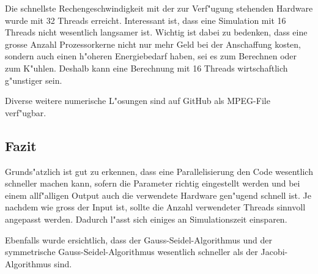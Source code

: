 \begin{refsection}
Die schnellste Rechengeschwindigkeit mit der zur Verf"ugung
stehenden Hardware wurde mit 32 Threads erreicht. Interessant ist, dass
eine Simulation mit 16 Threads nicht wesentlich langsamer ist. Wichtig
ist dabei zu bedenken, dass eine grosse Anzahl Prozessorkerne nicht
nur mehr Geld bei der Anschaffung kosten, sondern auch einen h"oheren
Energiebedarf haben, sei es zum Berechnen oder zum K"uhlen. Deshalb kann
eine Berechnung mit 16 Threads wirtschaftlich g"unstiger sein. 

Diverse weitere numerische L"osungen sind auf GitHub als
MPEG-File verf"ugbar.
	
\subsection{Fazit}
Grunds"atzlich ist gut zu erkennen, dass eine Parallelisierung den Code
wesentlich schneller machen kann, sofern die Parameter richtig eingestellt
werden und bei einem allf"alligen Output auch die verwendete Hardware
gen"ugend schnell ist. Je nachdem wie gross der Input ist, sollte die
Anzahl verwendeter Threads sinnvoll angepasst werden. Dadurch l"asst
sich einiges an Simulationszeit einsparen. 
	
Ebenfalls wurde ersichtlich, dass der Gauss-Seidel-Algorithmus
und der symmetrische Gauss-Seidel-Algorithmus wesentlich schneller als
der Jacobi-Algorithmus sind.
	
	
\end{refsection}
